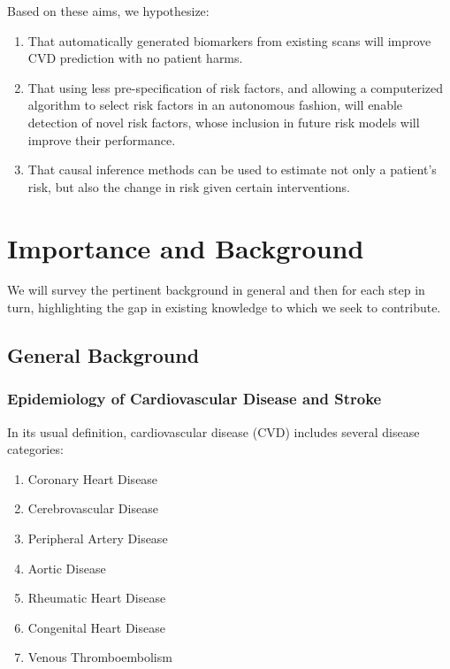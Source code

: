 \documentclass[a4paper,12pt]{article}
\begin{document}
		Based on these aims, we hypothesize:
		\begin{enumerate}
			
			\item That automatically generated biomarkers from existing scans will improve CVD prediction with no patient harms.
			
			\item That using less pre-specification of risk factors, and allowing a computerized algorithm to select risk factors in an autonomous fashion, will enable detection of novel risk factors, whose inclusion in future risk models will improve their performance.
			
			\item That causal inference methods can be used to estimate not only a patient's risk, but also the change in risk given certain interventions.
			
		\end{enumerate}
		
	\section{Importance and Background}
	
		We will survey the pertinent background in general and then for each step in turn, highlighting the gap in existing knowledge to which we seek to contribute.

		\subsection{General Background}
		
			\subsubsection{Epidemiology of Cardiovascular Disease and Stroke}
			
			In its usual definition, cardiovascular disease (CVD) includes several disease categories\cite{WHO2017}:
			\begin{enumerate}
				\item Coronary Heart Disease
				\item Cerebrovascular Disease
				\item Peripheral Artery Disease
				\item Aortic Disease
				\item Rheumatic Heart Disease
				\item Congenital Heart Disease
				\item Venous Thromboembolism
			\end{enumerate}
			
\end{document}

